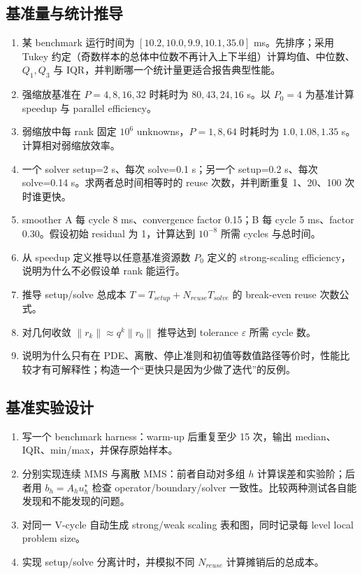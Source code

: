 \subsection*{基准量与统计推导}
\begin{enumerate}[label=\arabic*.]
\item 某 benchmark 运行时间为 $[10.2,10.0,9.9,10.1,35.0]$ ms。先排序；采用 Tukey 约定（奇数样本的总体中位数不再计入上下半组）计算均值、中位数、$Q_1,Q_3$ 与 IQR，并判断哪一个统计量更适合报告典型性能。
\item 强缩放基准在 $P=4,8,16,32$ 时耗时为 $80,43,24,16$ s。以 $P_0=4$ 为基准计算 speedup 与 parallel efficiency。
\item 弱缩放中每 rank 固定 $10^6$ unknowns，$P=1,8,64$ 时耗时为 $1.0,1.08,1.35$ s。计算相对弱缩放效率。
\item 一个 solver setup=2 s、每次 solve=0.1 s；另一个 setup=0.2 s、每次 solve=0.14 s。求两者总时间相等时的 reuse 次数，并判断重复 1、20、100 次时谁更快。
\item smoother A 每 cycle 8 ms、convergence factor 0.15；B 每 cycle 5 ms、factor 0.30。假设初始 residual 为 1，计算达到 $10^{-8}$ 所需 cycles 与总时间。

\item 从 speedup 定义推导以任意基准资源数 $P_0$ 定义的 strong-scaling efficiency，说明为什么不必假设单 rank 能运行。
\item 推导 setup/solve 总成本 $T=T_{setup}+N_{reuse}T_{solve}$ 的 break-even reuse 次数公式。
\item 对几何收敛 $\|r_k\|\approx q^k\|r_0\|$ 推导达到 tolerance $\varepsilon$ 所需 cycle 数。
\item 说明为什么只有在 PDE、离散、停止准则和初值等数值路径等价时，性能比较才有可解释性；构造一个“更快只是因为少做了迭代”的反例。
\end{enumerate}

\subsection*{基准实验设计}
\begin{enumerate}[label=\arabic*.]
\item 写一个 benchmark harness：warm-up 后重复至少 15 次，输出 median、IQR、min/max，并保存原始样本。
\item 分别实现连续 MMS 与离散 MMS：前者自动对多组 $h$ 计算误差和实验阶；后者用 $b_h=A_hu_h^\star$ 检查 operator/boundary/solver 一致性。比较两种测试各自能发现和不能发现的问题。
\item 对同一 V-cycle 自动生成 strong/weak scaling 表和图，同时记录每 level local problem size。
\item 实现 setup/solve 分离计时，并模拟不同 $N_{reuse}$ 计算摊销后的总成本。
\end{enumerate}

